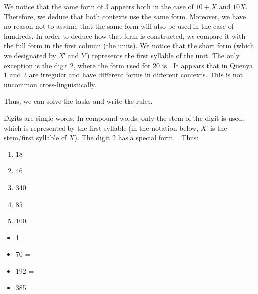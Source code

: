 \begin{refsection}
\begin{mysolution}
We notice that the same form of 3 appears both in the case of $10+X$ and $10X$. Therefore, we deduce that both contexts use the same form. Moreover, we have no reason not to assume that the same form will also be used in the case of hundreds. In order to deduce how that form is constructed, we compare it with the full form in the first column (the units). We notice that the short form (which we designated by $X$′ and $Y$′) represents the first syllable of the unit. The only exception is the digit 2, where the form used for 20 is . It appears that in Quenya 1 and 2 are irregular and have different forms in different contexts. This is not uncommon cross-linguistically. 

Thus, we can solve the tasks and write the rules.

 Digits are single words. In compound words, only the stem of the digit is used, which is represented by the first syllable (in the notation below, $X$′ is the stem/first syllable of $X$). The digit 2 has a special form, . Thus:


\pagebreak
\begin{assgts}
    \item
     \begin{multicols}{5}
        \begin{enumerate}[leftmargin = 1em, label = \alph*.]
            \item 18
            \item 46
            \item 340
            \item 85
            \item 100
        \end{enumerate}
    \end{multicols}
    \item
    \begin{multicols}{2}
    \setlength\columnsep{2em}
        \begin{itemize}[leftmargin = 0em]
            \item[] 1 = 
            \item[] 70 = 
            \item[] 192 = 
            \item[] 385 = 
        \end{itemize}
    \end{multicols}
\end{assgts}


\end{mysolution}
\end{refsection}
